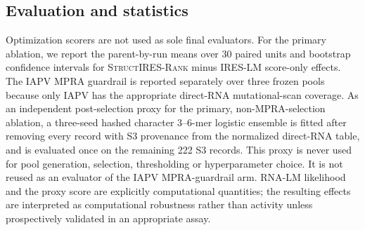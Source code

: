 \subsection{Evaluation and statistics}
Optimization scorers are not used as sole final evaluators. For the primary ablation, we report the
parent-by-run means over 30 paired units and bootstrap confidence intervals for \textsc{StructIRES-Rank}
minus IRES-LM score-only effects. The IAPV MPRA guardrail is reported separately over three frozen
pools because only IAPV has the appropriate direct-RNA mutational-scan coverage. As an independent
post-selection proxy for the primary, non-MPRA-selection ablation, a three-seed hashed character 3--6-mer
logistic ensemble is fitted after removing every record with S3 provenance from the normalized
direct-RNA table, and is evaluated once on the remaining 222 S3 records. This proxy is never used
for pool generation, selection, thresholding or hyperparameter choice. It is not reused as an
evaluator of the IAPV MPRA-guardrail arm. RNA-LM likelihood and the proxy score are explicitly
computational quantities; the resulting effects are interpreted as computational robustness rather
than activity unless prospectively validated in an appropriate assay.
